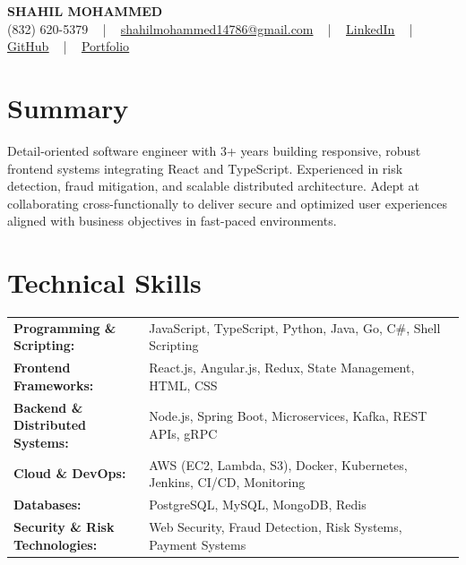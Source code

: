 \documentclass[letterpaper,11pt]{article}
\begin{document}
\begin{center}
    {\fontsize{14pt}{12pt}\selectfont \textbf{\MakeUppercase{Shahil Mohammed}}}\\ \vspace{2pt}
    \fontsize{10pt}{12pt}\selectfont (832) 620-5379 ~ | ~ \href{mailto:shahilmohammed14786@gmail.com}{shahilmohammed14786@gmail.com} ~ | ~  
    \href{https://www.linkedin.com/in/shahil-mohammed-9652931a1/}{\color{blue}\underline{LinkedIn}}  ~ | ~ 
    \href{https://github.com/freakbeast14}{\color{blue}\underline{GitHub}} ~ | ~ 
    \href{https://shahil-mohammed.netlify.app/}{\color{blue}\underline{Portfolio}}
    \vspace{-8pt}
\end{center}

\section{Summary}
\fontsize{9pt}{10pt}\selectfont
Detail-oriented software engineer with 3+ years building responsive, robust frontend systems integrating React and TypeScript. Experienced in risk detection, fraud mitigation, and scalable distributed architecture. Adept at collaborating cross-functionally to deliver secure and optimized user experiences aligned with business objectives in fast-paced environments.
 \vspace{-5pt}
 
\section{Technical Skills}
        \vspace{-14pt}
        \begin{table}[h]
            \fontsize{9pt}{10pt}\selectfont
            \begin{tabular}{p{0.3\linewidth} p{0.7\linewidth}}
                \textbf{Programming \& Scripting:} & JavaScript, TypeScript, Python, Java, Go, C\#, Shell Scripting \\
                \textbf{Frontend Frameworks:} & React.js, Angular.js, Redux, State Management, HTML, CSS \\
                \textbf{Backend \& Distributed Systems:} & Node.js, Spring Boot, Microservices, Kafka, REST APIs, gRPC \\
                \textbf{Cloud \& DevOps:} & AWS (EC2, Lambda, S3), Docker, Kubernetes, Jenkins, CI/CD, Monitoring \\
                \textbf{Databases:} & PostgreSQL, MySQL, MongoDB, Redis \\
                \textbf{Security \& Risk Technologies:} & Web Security, Fraud Detection, Risk Systems, Payment Systems \\
            \end{tabular}
        \end{table}
 \vspace{-15pt}
 
\end{document}

